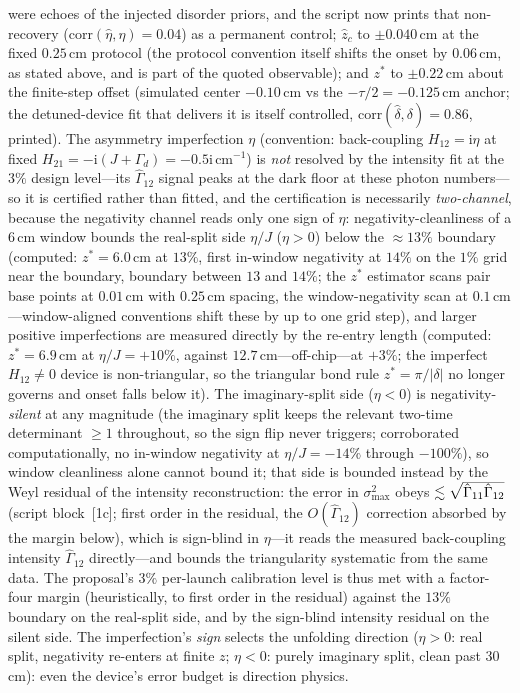 ﻿\documentclass[11pt]{article}
\newcommand{\ii}{\mathrm{i}}
\theoremstyle{remark}
\begin{document}
were echoes of the injected disorder priors, and the script now
prints that non-recovery ($\mathrm{corr}(\hat\eta,\eta)=0.04$) as
a permanent control; $\hat z_c$ to $\pm0.040$\,cm at the fixed
$0.25$\,cm protocol (the protocol convention itself shifts the
onset by $0.06$\,cm, as stated above, and is part of the quoted
observable); and $z^*$ to $\pm0.22$\,cm about the finite-step
offset (simulated center $-0.10$\,cm vs the $-\tau/2=-0.125$\,cm
anchor; the detuned-device fit that delivers it is itself
controlled, $\mathrm{corr}(\hat\delta,\delta)=0.86$, printed). The asymmetry
imperfection $\eta$ (convention: back-coupling $H_{12}=\ii\eta$ at
fixed $H_{21}=-\ii(J+\Gamma_d)=-0.5\ii$\,cm$^{-1}$) is \emph{not}
resolved by the intensity fit at the $3\%$ design level---its
$\hat\Gamma_{12}$ signal peaks at the dark floor at these photon
numbers---so it is certified rather than fitted, and the certification is
necessarily \emph{two-channel}, because the negativity channel
reads only one sign of $\eta$:
negativity-cleanliness of a $6$\,cm window bounds the real-split
side $\eta/J$ ($\eta>0$) below
the ${\approx}13\%$ boundary (computed: $z^*=6.0$\,cm at $13\%$,
first
in-window negativity at $14\%$ on the $1\%$ grid near the
boundary, boundary
between $13$ and $14\%$; the $z^*$ estimator scans pair base
points at $0.01$\,cm with $0.25$\,cm spacing, the window-negativity
scan at $0.1$\,cm---window-aligned conventions
shift these by up to one grid step), and larger positive
imperfections are
measured directly by the re-entry length (computed: $z^*=6.9$\,cm
at $\eta/J=+10\%$, against $12.7$\,cm---off-chip---at $+3\%$; the
imperfect $H_{12}\neq0$ device is non-triangular, so the triangular
bond rule $z^*=\pi/|\delta|$ no longer governs and onset falls below
it). The
imaginary-split side ($\eta<0$) is negativity-\emph{silent} at any
magnitude (the imaginary split keeps the relevant two-time
determinant $\ge1$ throughout, so the sign flip never triggers;
corroborated computationally, no in-window negativity at $\eta/J=-14\%$
through $-100\%$), so window cleanliness alone cannot bound it;
that side is bounded instead by the Weyl residual of the intensity
reconstruction: the error in $\sigma_{\max}^{2}$ obeys
$\lesssim\smash{\sqrt{\hat\Gamma_{11}\hat\Gamma_{12}}}$
(script block~[1c]; first order in the residual, the $O(\hat\Gamma_{12})$
correction absorbed by the margin below), which is sign-blind in $\eta$---it reads the
measured back-coupling intensity $\hat\Gamma_{12}$ directly---and
bounds the triangularity systematic from the same data. The
proposal's $3\%$
per-launch calibration level is thus met with a factor-four margin (heuristically, to first order in the residual)
against the $13\%$ boundary on the real-split side, and by the
sign-blind intensity residual on the silent side. The
imperfection's \emph{sign} selects the
unfolding direction ($\eta>0$: real split, negativity re-enters at
finite $z$; $\eta<0$: purely imaginary split, clean past
$30$\,cm): even the device's error budget is direction physics.
\end{document}
